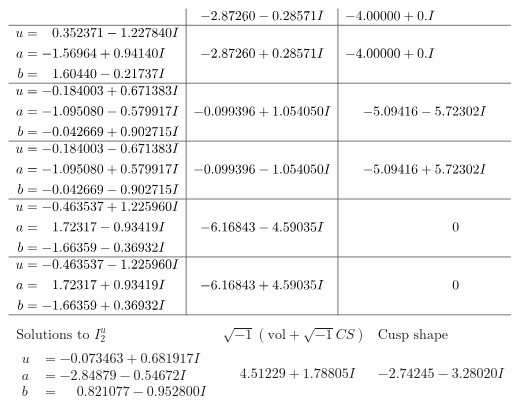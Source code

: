\documentclass[1p]{elsarticle_modified}
\theoremstyle{definition}
\newcommand{\I}{\sqrt{-1}}
\begin{document}
$$\begin{array}{c|c|c}
 & -2.87260 - 0.28571 I & -4.00000 + 0. I\phantom{ +0.000000I} \\ \hline\begin{aligned}
u &= \phantom{-}0.352371 - 1.227840 I \\
a &= -1.56964 + 0.94140 I \\
b &= \phantom{-}1.60440 - 0.21737 I\end{aligned}
 & -2.87260 + 0.28571 I & -4.00000 + 0. I\phantom{ +0.000000I} \\ \hline\begin{aligned}
u &= -0.184003 + 0.671383 I \\
a &= -1.095080 - 0.579917 I \\
b &= -0.042669 + 0.902715 I\end{aligned}
 & -0.099396 + 1.054050 I & -5.09416 - 5.72302 I \\ \hline\begin{aligned}
u &= -0.184003 - 0.671383 I \\
a &= -1.095080 + 0.579917 I \\
b &= -0.042669 - 0.902715 I\end{aligned}
 & -0.099396 - 1.054050 I & -5.09416 + 5.72302 I \\ \hline\begin{aligned}
u &= -0.463537 + 1.225960 I \\
a &= \phantom{-}1.72317 - 0.93419 I \\
b &= -1.66359 - 0.36932 I\end{aligned}
 & -6.16843 - 4.59035 I & \phantom{-0.000000 } 0 \\ \hline\begin{aligned}
u &= -0.463537 - 1.225960 I \\
a &= \phantom{-}1.72317 + 0.93419 I \\
b &= -1.66359 + 0.36932 I\end{aligned}
 & -6.16843 + 4.59035 I & \phantom{-0.000000 } 0\\
 \hline 
 \end{array}$$\newpage$$\begin{array}{c|c|c}  
\text{Solutions to }I^u_{2}& \I (\text{vol} + \sqrt{-1}CS) & \text{Cusp shape}\\
 \hline 
\begin{aligned}
u &= -0.073463 + 0.681917 I \\
a &= -2.84879 - 0.54672 I \\
b &= \phantom{-}0.821077 - 0.952800 I\end{aligned}
 & \phantom{-}4.51229 + 1.78805 I & -2.74245 - 3.28020 I \\ \hline\begin{aligned}

\end{aligned}
\end{array}$$
\end{document}
